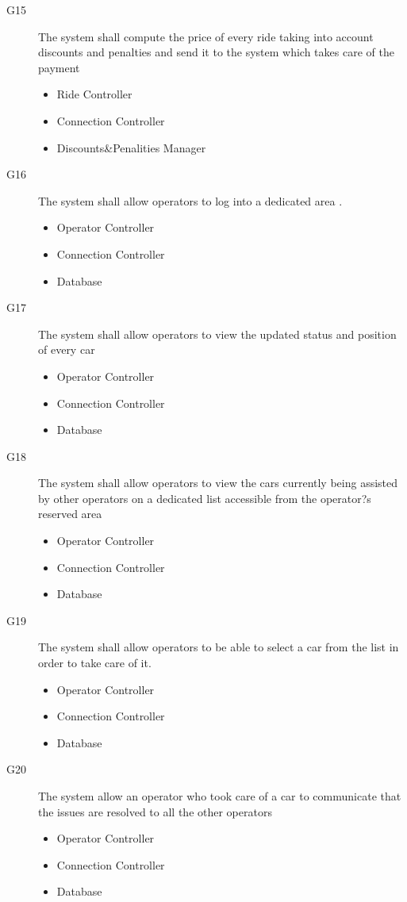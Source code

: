 \documentclass{article}
\begin{document}
\begin{flushleft}
\begin{description}
\item [G15] The system shall compute the price of every ride taking into account discounts and penalties and send it to the system which takes care of the payment
\begin{itemize}
\item Ride Controller
\item Connection Controller
\item Discounts\&Penalities Manager
\end{itemize}



\item [G16] The system shall allow operators to log into a dedicated area .
\begin{itemize}
\item Operator Controller
\item Connection Controller
\item Database
\end{itemize}

\item [G17] The system shall allow operators to view the updated status and position of every car
\begin{itemize}
\item Operator Controller
\item Connection Controller
\item Database
\end{itemize}


\item [G18] The system shall allow operators to view the cars currently being assisted by other operators on a dedicated list accessible from the operator?s reserved area
\begin{itemize}
\item Operator Controller
\item Connection Controller
\item Database
\end{itemize}


\item [G19] The system shall allow operators to be able to select a car from the list in order to take care of it.
\begin{itemize}
\item Operator Controller
\item Connection Controller
\item Database
\end{itemize}


\item [G20] The system allow an operator who took care of a car to communicate that the issues are resolved to all the other operators
\begin{itemize}
\item Operator Controller
\item Connection Controller
\item Database
\end{itemize}





\end{description}
\end{flushleft}
\end{document}
